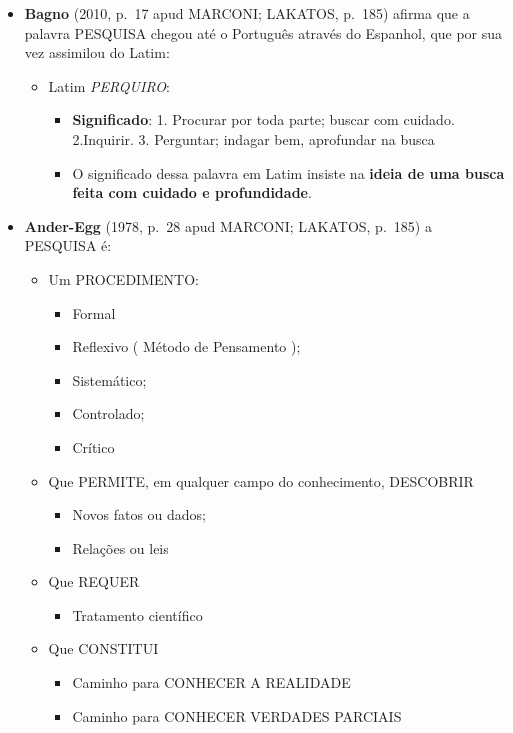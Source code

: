 \documentclass[
]{book}
\providecommand{\tightlist}{%
  \setlength{\itemsep}{0pt}\setlength{\parskip}{0pt}}
\begin{document}
\begin{itemize}
\tightlist
\item
  \textbf{Bagno} (2010, p.~17 apud MARCONI; LAKATOS, p.~185) afirma que
  a palavra PESQUISA chegou até o Português através do Espanhol, que por
  sua vez assimilou do Latim:

  \begin{itemize}
  \tightlist
  \item
    Latim \emph{PERQUIRO}:

    \begin{itemize}
    \tightlist
    \item
      \textbf{Significado}: 1. Procurar por toda parte; buscar com
      cuidado. 2.Inquirir. 3. Perguntar; indagar bem, aprofundar na
      busca
    \item
      O significado dessa palavra em Latim insiste na \textbf{ideia de
      uma busca feita com cuidado e profundidade}.
    \end{itemize}
  \end{itemize}
\item
  \textbf{Ander-Egg} (1978, p.~28 apud MARCONI; LAKATOS, p.~185) a
  PESQUISA é:

  \begin{itemize}
  \tightlist
  \item
    Um PROCEDIMENTO:

    \begin{itemize}
    \tightlist
    \item
      Formal
    \item
      Reflexivo ( Método de Pensamento );
    \item
      Sistemático;
    \item
      Controlado;
    \item
      Crítico
    \end{itemize}
  \item
    Que PERMITE, em qualquer campo do conhecimento, DESCOBRIR

    \begin{itemize}
    \tightlist
    \item
      Novos fatos ou dados;
    \item
      Relações ou leis
    \end{itemize}
  \item
    Que REQUER

    \begin{itemize}
    \tightlist
    \item
      Tratamento científico
    \end{itemize}
  \item
    Que CONSTITUI

    \begin{itemize}
    \tightlist
    \item
      Caminho para CONHECER A REALIDADE
    \item
      Caminho para CONHECER VERDADES PARCIAIS
    \end{itemize}
  \end{itemize}
\end{itemize}
\end{document}
